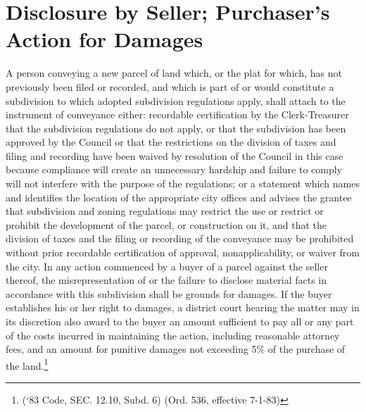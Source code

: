 \section{Disclosure by Seller; Purchaser’s Action for Damages}
A person conveying a new parcel of land which, or the plat for which, has not previously been filed or recorded, and which is part of or would constitute a subdivision to which adopted subdivision regulations apply, shall attach to the instrument of conveyance either: recordable certification by the Clerk-Treasurer that the subdivision regulations do not apply, or that the subdivision has been approved by the Council or that the restrictions on the division of taxes and filing and recording have been waived by resolution of the Council in this case because compliance will create an unnecessary hardship and failure to comply will not interfere with the purpose of the regulations; or a statement which names and identifies the location of the appropriate city offices and advises the grantee that subdivision and zoning regulations may restrict the use or restrict or prohibit the development of the parcel, or construction on it, and that the division of taxes and the filing or recording of the conveyance may be prohibited without prior recordable certification of approval, nonapplicability, or waiver from the city. In any action commenced by a buyer of a parcel against the seller thereof, the misrepresentation of or the failure to disclose material facts in accordance with this subdivision shall be grounds for damages.  If the buyer establishes his or her right to damages, a district court hearing the matter may in its discretion also award to the buyer an amount sufficient to pay all or any part of the costs incurred in maintaining the action, including reasonable attorney fees, and an amount for punitive damages not exceeding 5\% of the purchase of the land.\footnote{(‘83 Code, SEC. 12.10, Subd. 6)  (Ord. 536, effective 7-1-83)}

